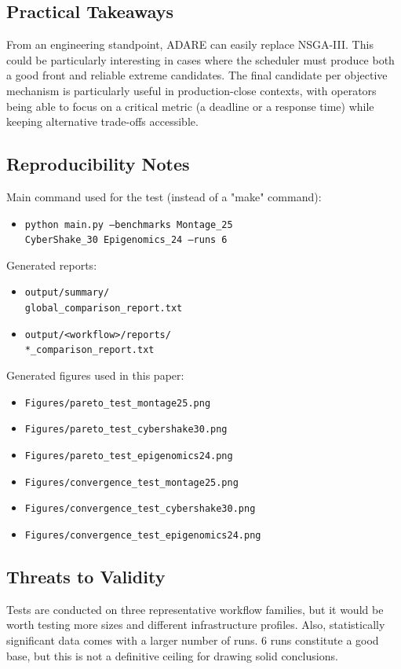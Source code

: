 \documentclass[conference]{IEEEtran}
\begin{document}
\subsection{Practical Takeaways}
From an engineering standpoint, ADARE can easily replace NSGA-III. This could be particularly interesting in cases where the scheduler must produce both a good front and reliable extreme candidates.
The final candidate per objective mechanism is particularly useful in production-close contexts, with operators being able to focus on a critical metric (a deadline or a response time) while keeping alternative trade-offs accessible.

\subsection{Reproducibility Notes}
Main command used for the test (instead of a "make" command):
\begin{itemize}
    \item \texttt{python main.py --benchmarks Montage\_25}\\
    \texttt{CyberShake\_30 Epigenomics\_24 --runs 6}
\end{itemize}
Generated reports:
\begin{itemize}
    \item \texttt{output/summary/}\\
          \texttt{global\_comparison\_report.txt}
    \item \texttt{output/<workflow>/reports/}\\
          \texttt{*\_comparison\_report.txt}
\end{itemize}
Generated figures used in this paper:
\begin{itemize}
    \item \texttt{Figures/pareto\_test\_montage25.png}
    \item \texttt{Figures/pareto\_test\_cybershake30.png}
    \item \texttt{Figures/pareto\_test\_epigenomics24.png}
    \item \texttt{Figures/convergence\_test\_montage25.png}
    \item \texttt{Figures/convergence\_test\_cybershake30.png}
    \item \texttt{Figures/convergence\_test\_epigenomics24.png}
\end{itemize}

\subsection{Threats to Validity}
Tests are conducted on three representative workflow families, but it would be worth testing more sizes and different infrastructure profiles.
Also, statistically significant data comes with a larger number of runs. 6 runs constitute a good base, but this is not a definitive ceiling for drawing solid conclusions.
\end{document}
